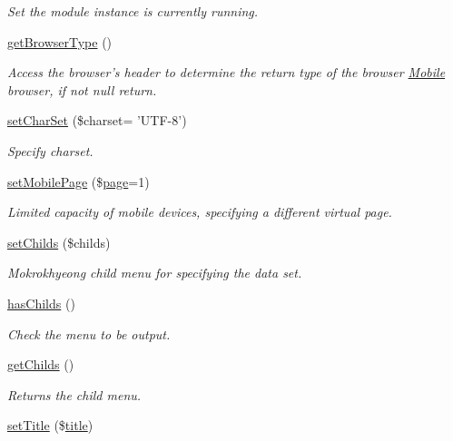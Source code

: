 \begin{DoxyCompactItemize}
\begin{DoxyCompactList}\small\item\em Set the module instance is currently running. \end{DoxyCompactList}\item 
\hyperlink{classmobileXE_a462a4900af63aa2bfbcea2168afbe876}{get\-Browser\-Type} ()
\begin{DoxyCompactList}\small\item\em Access the browser's header to determine the return type of the browser \hyperlink{classMobile}{Mobile} browser, if not null return. \end{DoxyCompactList}\item 
\hyperlink{classmobileXE_ad12dcc0e8a5dd3a507587516e3a62f2a}{set\-Char\-Set} (\$charset= 'U\-T\-F-\/8')
\begin{DoxyCompactList}\small\item\em Specify charset. \end{DoxyCompactList}\item 
\hyperlink{classmobileXE_a462ec879b69ab476662754aec66800dd}{set\-Mobile\-Page} (\$\hyperlink{classpage}{page}=1)
\begin{DoxyCompactList}\small\item\em Limited capacity of mobile devices, specifying a different virtual page. \end{DoxyCompactList}\item 
\hyperlink{classmobileXE_a0ea0dec157552b699d23388b257d22a6}{set\-Childs} (\$childs)
\begin{DoxyCompactList}\small\item\em Mokrokhyeong child menu for specifying the data set. \end{DoxyCompactList}\item 
\hyperlink{classmobileXE_a680f6a6b774bf12be4c67b6a9215f1ea}{has\-Childs} ()
\begin{DoxyCompactList}\small\item\em Check the menu to be output. \end{DoxyCompactList}\item 
\hyperlink{classmobileXE_a650f04e4701a5a1ae2ddceeb0f401166}{get\-Childs} ()
\begin{DoxyCompactList}\small\item\em Returns the child menu. \end{DoxyCompactList}\item 
\hyperlink{classmobileXE_a6ae064d89d2b926d7c96f59257692a01}{set\-Title} (\$\hyperlink{ko_8install_8php_a5b072c5fd1d2228c6ba5cee13cd142e3}{title})

\end{DoxyCompactItemize}
